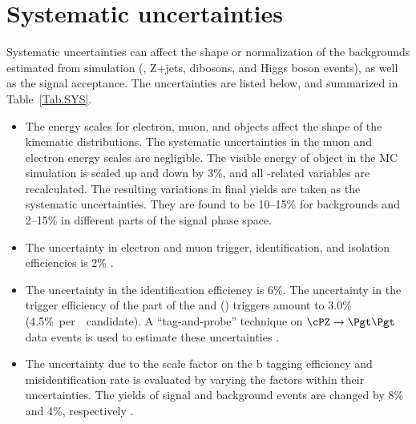 \section{Systematic uncertainties}
\label{sect:sys}
Systematic uncertainties can affect the shape or normalization of the
backgrounds estimated from simulation (\ttbar, Z+jets, dibosons, and Higgs boson events), 
as well as the signal acceptance. 
The uncertainties are listed below, and summarized in Table~\ref{Tab.SYS}.


\begin{itemize}

\item  The energy scales for electron, muon, and \Tau objects affect the shape of the kinematic distributions.
 The systematic uncertainties in the muon and electron energy scales are negligible.
The visible energy of \Tau object in the MC simulation is scaled up and down
by 3\%, and all \Tau-related variables are recalculated. The resulting variations in
final yields are taken as the systematic uncertainties. They are found to be 10--15\% for 
backgrounds and 2--15\% in different parts of the signal phase space.


\item The uncertainty in electron and muon trigger, identification, and
  isolation efficiencies is 2\% \cite{Khachatryan:2014wca}.

\item The uncertainty in the \Tau identification efficiency is 6\%. 
  The uncertainty in the trigger efficiency of the \Tau part of the \eTau and
  \muTau (\tauTau) triggers amount to 3.0\% (4.5\%~per~\Tau~candidate).
  A ``tag-and-probe'' technique \cite{Chatrchyan:2014mua} on $\cPZ\to \Pgt\Pgt$ data events is used to estimate these 
  uncertainties \cite{Khachatryan:2014wca}.

\item The uncertainty due to the scale factor on the b tagging
efficiency and misidentification rate is evaluated by varying the 
factors within their uncertainties. The yields of signal and background events are changed by 8\% 
and 4\%, respectively \cite{Chatrchyan:2012jua}.
 

\end{itemize}

